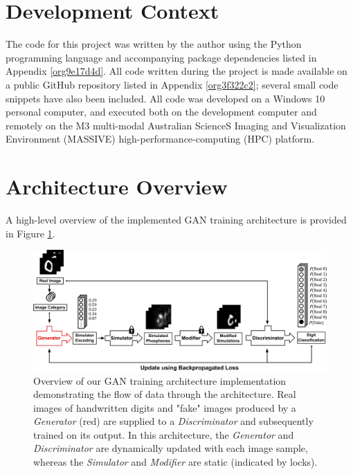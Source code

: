 \documentclass[a4paper,11pt,openany]{book}
\begin{document}
\section*{Development Context}
\label{sec:orgf6cf7ae}

The code for this project was written by the author using the Python programming language and accompanying package dependencies listed in Appendix \ref{org9e17d4d}.
All code written during the project is made available on a public GitHub repository listed in Appendix \ref{org3f322c2}; several small code snippets have also been included.
All code was developed on a Windows 10 personal computer, and executed both on the development computer and remotely on the M3 multi-modal Australian ScienceS Imaging and Visualization Environment (MASSIVE) high-performance-computing (HPC) platform. \cite{Goscinski2014}

\section*{Architecture Overview}
\label{sec:org528071c}

A high-level overview of the implemented GAN training architecture is provided in Figure \ref{orgfd7b1c9}.

\begin{figure}
\begin{center}
\includegraphics[width=.9\linewidth]{images/methods_training_architecture.png}
\end{center}
\caption[Overview of GAN training architecture implementation]{\label{orgfd7b1c9}
Overview of our GAN training architecture implementation demonstrating the flow of data through the architecture. Real images of handwritten digits and "fake" images produced by a \emph{Generator} (red) are supplied to a \emph{Discriminator} and subsequently trained on its output. In this architecture, the \emph{Generator} and \emph{Discriminator} are dynamically updated with each image sample, whereas the \emph{Simulator} and \emph{Modifier} are static (indicated by locks).}
\end{figure}
\end{document}
